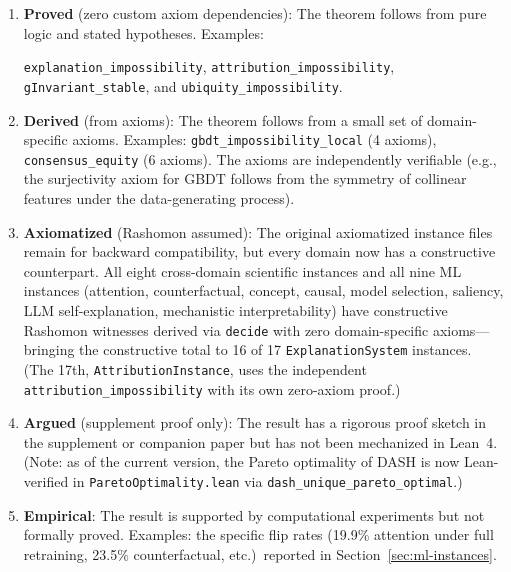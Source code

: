 \documentclass[11pt,a4paper]{article}
\begin{document}
\begin{enumerate}[label=(\alph*)]
  \item \textbf{Proved} (zero custom axiom dependencies): The theorem
    follows from pure logic and stated hypotheses.  Examples:
    {\raggedright\texttt{explanation\_impossibility},
    \texttt{attribution\_impossibility},
    \texttt{gInvariant\_stable}, and
    \texttt{ubiquity\_impossibility}.\par}

  \item \textbf{Derived} (from axioms): The theorem follows from a small set
    of domain-specific axioms.  Examples: \texttt{gbdt\_impossibility\_local}
    (4 axioms), \texttt{consensus\_equity} (6 axioms).  The axioms are
    independently verifiable (e.g., the surjectivity axiom for GBDT follows
    from the symmetry of collinear features under the data-generating process).

  \item \textbf{Axiomatized} (Rashomon assumed): The original axiomatized
    instance files remain for backward compatibility, but every domain now
    has a constructive counterpart.  All eight cross-domain scientific
    instances and all nine ML instances (attention, counterfactual, concept,
    causal, model selection, saliency, LLM self-explanation, mechanistic
    interpretability) have constructive Rashomon witnesses derived via
    \texttt{decide} with zero domain-specific axioms---bringing the
    constructive total to 16 of 17 \texttt{ExplanationSystem} instances.
    (The 17th, \texttt{AttributionInstance}, uses the independent
    \texttt{attribution\_impossibility} with its own zero-axiom proof.)

  \item \textbf{Argued} (supplement proof only): The result has a
    rigorous proof sketch in the supplement or companion paper but has
    not been mechanized in Lean~4.  (Note: as of the current version,
    the Pareto optimality of DASH is now Lean-verified in
    \texttt{ParetoOptimality.lean} via
    \texttt{dash\_unique\_pareto\_optimal}.)

  \item \textbf{Empirical}: The result is supported by computational
    experiments but not formally proved.  Examples: the specific flip
    rates (19.9\% attention under full retraining, 23.5\%
    counterfactual, etc.)\ reported in Section~\ref{sec:ml-instances}.
\end{enumerate}
\end{document}

